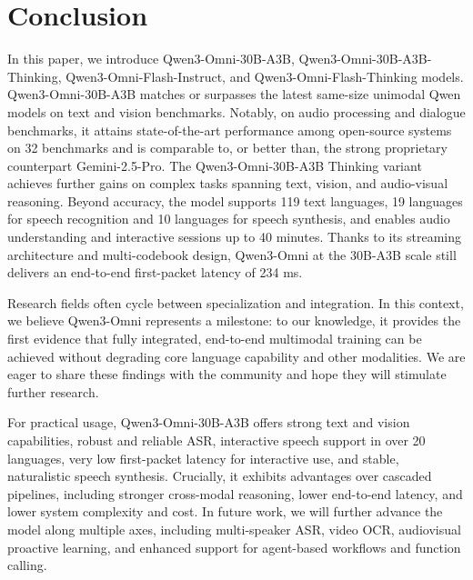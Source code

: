 
\section{Conclusion}
\label{sec:conclusion}
In this paper, we introduce Qwen3-Omni-30B-A3B, Qwen3-Omni-30B-A3B-Thinking, Qwen3-Omni-Flash-Instruct, and Qwen3-Omni-Flash-Thinking models. Qwen3-Omni-30B-A3B matches or surpasses the latest same-size unimodal Qwen models on text and vision benchmarks. Notably, on audio processing and dialogue benchmarks, it attains state-of-the-art performance among open-source systems on 32 benchmarks and is comparable to, or better than, the strong proprietary counterpart Gemini-2.5-Pro. The Qwen3-Omni-30B-A3B Thinking variant achieves further gains on complex tasks spanning text, vision, and audio-visual reasoning. Beyond accuracy, the model supports 119 text languages, 19 languages for speech recognition and 10 languages for speech synthesis, and enables audio understanding and interactive sessions up to 40 minutes. Thanks to its streaming architecture and multi-codebook design, Qwen3-Omni at the 30B-A3B scale still delivers an end-to-end first-packet latency of 234 ms.

Research fields often cycle between specialization and integration. In this context, we believe Qwen3-Omni represents a milestone: to our knowledge, it provides the first evidence that fully integrated, end-to-end multimodal training can be achieved without degrading core language capability and other modalities. We are eager to share these findings with the community and hope they will stimulate further research.

For practical usage, Qwen3-Omni-30B-A3B offers strong text and vision capabilities, robust and reliable ASR, interactive speech support in over 20 languages, very low first-packet latency for interactive use, and stable, naturalistic speech synthesis. Crucially, it exhibits advantages over cascaded pipelines, including stronger cross-modal reasoning, lower end-to-end latency, and lower system complexity and cost. In future work, we will further advance the model along multiple axes, including multi-speaker ASR, video OCR, audiovisual proactive learning, and enhanced support for agent-based workflows and function calling.
